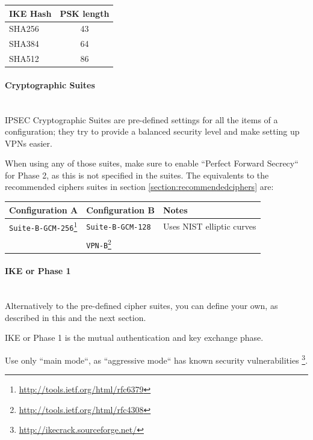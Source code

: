 \begin{description}
\begin{table}[h]
  \centering
  \small
  \begin{tabular}{lc}
    \toprule
    IKE Hash & PSK length \\
    \midrule
    SHA256 & 43 \\
    SHA384 & 64 \\
    SHA512 & 86 \\
    \bottomrule
  \end{tabular}
\end{table}

\paragraph*{Cryptographic Suites}\mbox{}\\

IPSEC Cryptographic Suites are pre-defined settings for all the
items of a configuration; they try to provide a balanced security
level and make setting up VPNs easier.

When using any of those suites, make sure to enable ``Perfect Forward
Secrecy`` for Phase 2, as this is not specified in the suites. The
equivalents to the recommended ciphers suites in section
\ref{section:recommendedciphers} are:

\begin{table}[h]
  \centering
  \small
  \begin{tabular}{lll}
    \toprule
    Configuration A & Configuration B & Notes\\
    \midrule
    \verb|Suite-B-GCM-256|\footnote{\url{http://tools.ietf.org/html/rfc6379}} &
\verb|Suite-B-GCM-128| & Uses NIST elliptic curves
\\ & \verb|VPN-B|\footnote{\url{http://tools.ietf.org/html/rfc4308}} &
\\
    \bottomrule
  \end{tabular}
\end{table}

\paragraph*{IKE or Phase 1}\mbox{}\\

Alternatively to the pre-defined cipher suites, you can define your
own, as described in this and the next section.

IKE or Phase 1 is the mutual authentication and key exchange phase.

Use only ``main mode``, as ``aggressive mode`` has known security
vulnerabilities \footnote{\url{http://ikecrack.sourceforge.net/}}.


\end{description}

